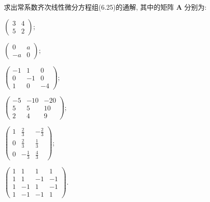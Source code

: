 \begin{exercise}
  求出常系数齐次线性微分方程组(6.25)的通解, 其中的矩阵 $\bm{A}$ 分别为:
  \begin{mathtasks2}
    \item $\displaystyle\begin{pmatrix}3&4\\5&2\end{pmatrix}$;
    \item $\displaystyle\begin{pmatrix}0&a\\-a&0\end{pmatrix}$;
    \item $\displaystyle\begin{pmatrix}-1&1&0\\0&-1&0\\1&0&-4\end{pmatrix}$;
    \item $\displaystyle\begin{pmatrix}-5&-10&-20\\5&5&10\\2&4&9\end{pmatrix}$;
    \item $\displaystyle\begin{pmatrix}1&\frac{2}{3}&-\frac{2}{3}\\0&\frac{2}{3}&\frac{1}{3}\\0&-\frac{1}{3}&\frac{4}{3}\end{pmatrix}$;
    \item $\displaystyle\begin{pmatrix}1&1&1&1\\1&1&-1&-1\\1&-1&1&-1\\1&-1&-1&1\end{pmatrix}$.
  \end{mathtasks2}
\end{exercise}

